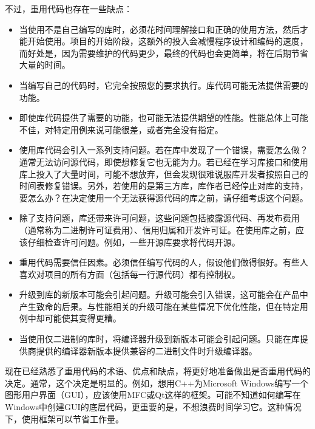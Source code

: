 
不过，重用代码也存在一些缺点：

\begin{itemize}
\item
当使用不是自己编写的库时，必须花时间理解接口和正确的使用方法，然后才能开始使用。项目的开始阶段，这额外的投入会减慢程序设计和编码的速度，而好处是，因为需要维护的代码更少，最终的代码也会更简单，将在后期节省大量的时间。

\item
当编写自己的代码时，它完全按照您的要求执行。库代码可能无法提供需要的功能。

\item
即使库代码提供了需要的功能，也可能无法提供期望的性能。性能总体上可能不佳，对特定用例来说可能很差，或者完全没有指定。

\item
使用库代码会引入一系列支持问题。若在库中发现了一个错误，需要怎么做？通常无法访问源代码，即使想修复它也无能为力。若已经在学习库接口和使用库上投入了大量时间，可能不想放弃，但会发现很难说服库开发者按照自己的时间表修复错误。另外，若使用的是第三方库，库作者已经停止对库的支持，要怎么办？在决定使用一个无法获得源代码的库之前，请仔细考虑这个问题。

\item
除了支持问题，库还带来许可问题，这些问题包括披露源代码、再发布费用（通常称为二进制许可证费用）、信用归属和开发许可证。在使用库之前，应该仔细检查许可问题。例如，一些开源库要求将代码开源。

\item
重用代码需要信任因素。必须信任编写代码的人，假设他们做得很好。有些人喜欢对项目的所有方面（包括每一行源代码）都有控制权。

\item
升级到库的新版本可能会引起问题。升级可能会引入错误，这可能会在产品中产生致命的后果。与性能相关的升级可能在某些情况下优化性能，但在特定用例中却可能使其变得更糟。

\item
当使用仅二进制的库时，将编译器升级到新版本可能会引起问题。只能在库提供商提供的编译器新版本提供兼容的二进制文件时升级编译器。
\end{itemize}


现在已经熟悉了重用代码的术语、优点和缺点，将更好地准备做出是否重用代码的决定。通常，这个决定是明显的。例如，想用C++为Microsoft Windows编写一个图形用户界面（GUI），应该使用MFC或Qt这样的框架。可能不知道如何编写在Windows中创建GUI的底层代码，更重要的是，不想浪费时间学习它。这种情况下，使用框架可以节省工作量。

